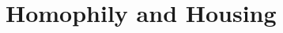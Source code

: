 \documentclass[12pt,letterpaper,english]{article}
\begin{document}

%




%




\section{Homophily and Housing}
\label{sec:homophilyHousing}
\end{document}
